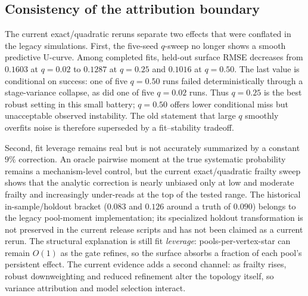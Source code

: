 \documentclass[11pt]{article}
\begin{document}
\subsection{Consistency of the attribution boundary}\label{sec:leverage}

The current exact/quadratic reruns separate two effects that were conflated in the
legacy simulations. First, the five-seed $q$-sweep no longer shows a smooth predictive
U-curve. Among completed fits, held-out surface RMSE decreases from $0.1603$ at $q=0.02$
to $0.1287$ at $q=0.25$ and $0.1016$ at $q=0.50$. The last value is conditional on
success: one of five $q=0.50$ runs failed deterministically through a stage-variance
collapse, as did one of five $q=0.02$ runs. Thus $q=0.25$ is the best robust setting in
this small battery; $q=0.50$ offers lower conditional miss but unacceptable observed
instability. The old statement that large $q$ smoothly overfits noise is therefore
superseded by a fit--stability tradeoff.

Second, fit leverage remains real but is not accurately summarized by a constant
$9\%$ correction. An oracle pairwise moment at the true systematic probability remains
a mechanism-level control, but the current exact/quadratic frailty sweep shows that the
analytic correction is nearly unbiased only at low and moderate frailty and increasingly
under-reads at the top of the tested range. The historical in-sample/holdout bracket
($0.083$ and $0.126$ around a truth of $0.090$) belongs to the legacy pool-moment
implementation; its specialized holdout transformation is not preserved in the current
release scripts and has not been claimed as a current rerun. The structural explanation
is still fit \emph{leverage}: pools-per-vertex-star can remain $O(1)$ as the gate refines,
so the surface absorbs a fraction of each pool's persistent effect. The current evidence
adds a second channel: as frailty rises, robust downweighting and reduced refinement alter
the topology itself, so variance attribution and model selection interact.
\end{document}
